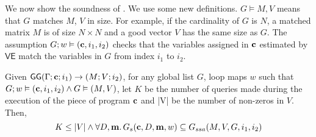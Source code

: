 We now show the soundness of {\ADAPTSYSTEM}. We use some new definitions. $G \vDash M, V$ means that $G$ matches $M$, $V$ in size. For example, if the cardinality of $G$ is $N$, a matched matrix $M$ is of size $N\times N$ and a good vector $V$ has the same size as $G$. The assumption $G; w \vDash ({\bf{{c}}}, i_1,i_2)$ checks that the variables assigned in ${\bf{{c}}}$ estimated by $\mathsf{VE}$ match the variables in $G$ from index $i_1$ to $i_2$.

\begin{thm}
Given $ \mathsf{GG}{(\Gamma; {\bf{{c}}}; i_1 )}\to {(M; V;i_2)}$,  for any global list $G$,  loop maps $w$ such that $G ;w \vDash ({\bf{{c}}}, i_1, i_2) \land G \vDash (M,V)$, let $K$ be the number of queries made during the execution of the piece of program ${\bf{{c}}}$ and |V| be the number of non-zeros in $V$. 
Then,
\[
K \leq |V| \land \forall D, {\bf{{m}}}.\, G_{s}({\bf{{c}}},D,{\bf{{m}}},w) \subseteq G_{ssa}(M, V,G,i_1, i_2)
\]      
\end{thm}
